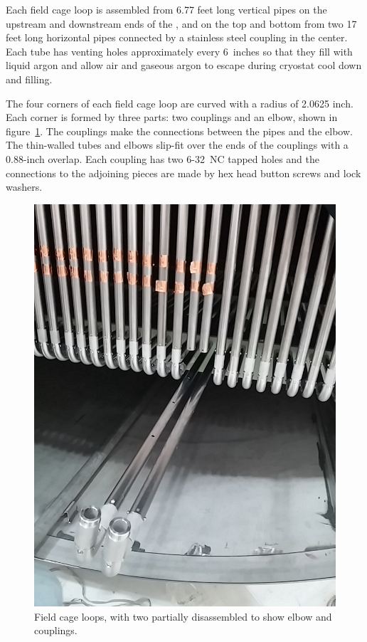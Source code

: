 Each field cage loop is assembled from 6.77 feet long vertical pipes on the upstream and downstream ends of the \lartpc, and on the top and bottom from two 17 feet long horizontal pipes connected by a stainless steel coupling in the center.  Each tube has venting holes approximately every 6~inches so that they fill with liquid argon and allow air and gaseous argon to escape during cryostat cool down and filling.

The four corners of each field cage loop are curved with a radius of 2.0625 inch. Each corner is formed by three parts: two couplings and an elbow, shown in figure~\ref{fig:tpc-fieldcage-elbows}. The couplings make the connections between the pipes and the elbow. The thin-walled tubes and elbows slip-fit over the ends of the couplings with a 0.88-inch overlap. Each coupling has two 6-32~NC tapped holes and the connections to the adjoining pieces are made by hex head button screws and lock washers.

\begin{figure}[htb]
\centering	
\includegraphics[width=0.8\linewidth]{figures/tpc-fieldcage-elbows.jpg}
\caption{Field cage loops, with two partially disassembled to show elbow and couplings.}
\label{fig:tpc-fieldcage-elbows}
\end{figure}


